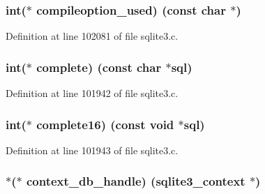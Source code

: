 \subsubsection[{compileoption\+\_\+used}]{\setlength{\rightskip}{0pt plus 5cm}int($\ast$ compileoption\+\_\+used) (const char $\ast$)}\label{structsqlite3__api__routines_ae4519132382d8a2a96ff7fb756404e47}


Definition at line 102081 of file sqlite3.\+c.

\hypertarget{structsqlite3__api__routines_a01aaed823d8c17a17f125d1abaf5eac9}{}
\subsubsection[{complete}]{\setlength{\rightskip}{0pt plus 5cm}int($\ast$ complete) (const char $\ast${\bf sql})}\label{structsqlite3__api__routines_a01aaed823d8c17a17f125d1abaf5eac9}


Definition at line 101942 of file sqlite3.\+c.

\hypertarget{structsqlite3__api__routines_a6d6690a5ad824d944df098f0efb92c06}{}
\subsubsection[{complete16}]{\setlength{\rightskip}{0pt plus 5cm}int($\ast$ complete16) (const void $\ast${\bf sql})}\label{structsqlite3__api__routines_a6d6690a5ad824d944df098f0efb92c06}


Definition at line 101943 of file sqlite3.\+c.

\hypertarget{structsqlite3__api__routines_ae2cf2d3a199a126857e80c067cd8bf48}{}
\subsubsection[{context\+\_\+db\+\_\+handle}]{$\ast$($\ast$ context\+\_\+db\+\_\+handle) ({\bf sqlite3\+\_\+context} $\ast$)}\label{structsqlite3__api__routines_ae2cf2d3a199a126857e80c067cd8bf48}


